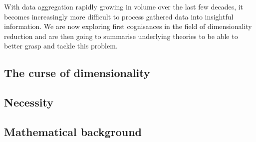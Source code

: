 With data aggregation rapidly growing in volume over the last few decades, it becomes increasingly more difficult to process gathered data into insightful information.
We are now exploring first cognisances in the field of dimensionality reduction and are then going to summarise underlying theories to be able to better grasp and tackle this problem.

\vfill

\subsection{The curse of dimensionality} \label{curseOfDimensionality}

\vfill
\clearpage


\subsection{Necessity}

\clearpage


\subsection{Mathematical background}



